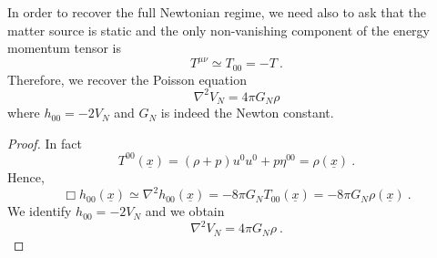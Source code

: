     In order to recover the full Newtonian regime, we need also to ask that the matter source is static and the only non-vanishing component of the energy momentum tensor is
    \begin{equation*}
        T^{\mu\nu} \simeq T_{00} = - T ~.
    \end{equation*}
    Therefore, we recover the Poisson equation
    \begin{equation*}
        \nabla^2 V_N = 4 \pi G_N \rho
    \end{equation*}
    where $h_{00} = - 2 V_N$ and $G_N$ is indeed the Newton constant.
    \begin{proof}
        In fact 
        \begin{equation*}
            T^{00} (\underline x) = (\rho + p) u^0 u^0 + p \eta^{00} = \rho (\underline x) ~.
        \end{equation*}
        Hence, 
        \begin{equation*}
            \Box h_{00} (\underline x) \simeq \nabla^2 h_{00} (\underline x) = - 8 \pi G_N T_{00} (\underline x) = - 8 \pi G_N \rho(\underline x) ~.
        \end{equation*}
        We identify $h_{00} = - 2 V_N$ and we obtain 
        \begin{equation*}
            \nabla^2 V_N = 4 \pi G_N \rho ~.
        \end{equation*}
    \end{proof}
    
